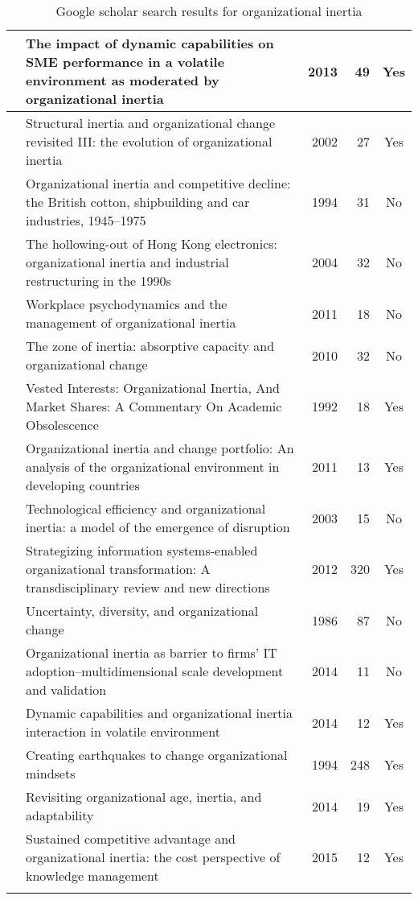 \begin{longtable}{|c|>{\raggedright\arraybackslash}p{3.7cm}|r|r|c|}
	\hline 
    \cite{nedzinskas2013impact} & The impact of dynamic capabilities on SME performance in a volatile environment as moderated by organizational inertia & 2013 & 49 & Yes \\
	\hline 
    \cite{hannan2002structural} & Structural inertia and organizational change revisited III: the evolution of organizational inertia & 2002 & 27 & Yes \\
	\hline 
    \cite{lorenz1994organizational} & Organizational inertia and competitive decline: the British cotton, shipbuilding and car industries, 1945--1975 & 1994 & 31 & No \\
	\hline 
    \cite{chiu2004hollowing} & The hollowing-out of Hong Kong electronics: organizational inertia and industrial restructuring in the 1990s & 2004 & 32 & No \\
	\hline 
    \cite{allcorn2011workplace} & Workplace psychodynamics and the management of organizational inertia & 2011 & 18 & No \\
	\hline 
    \cite{godkin2010zone} & The zone of inertia: absorptive capacity and organizational change & 2010 & 32 & No \\
	\hline 
    \cite{bromley1992vested} & Vested Interests: Organizational Inertia, And Market Shares: A Commentary On Academic Obsolescence & 1992 & 18 & Yes \\
	\hline 
    \cite{majid2011organizational} & Organizational inertia and change portfolio: An analysis of the organizational environment in developing countries & 2011 & 13 & Yes \\
	\hline 
    \cite{buchta2003technological} & Technological efficiency and organizational inertia: a model of the emergence of disruption & 2003 & 15 & No \\
	\hline 
    \cite{besson2012strategizing} & Strategizing information systems-enabled organizational transformation: A transdisciplinary review and new directions & 2012 & 320 & Yes \\
	\hline 
    \cite{hannan1986uncertainty} & Uncertainty, diversity, and organizational change & 1986 & 87 & No \\
	\hline 
    \cite{haag2014organizational} & Organizational inertia as barrier to firms’ IT adoption--multidimensional scale development and validation & 2014 & 11 & No \\
	\hline 
    \cite{nedzinskas2014dynamic} & Dynamic capabilities and organizational inertia interaction in volatile environment & 2014 & 12 & Yes \\
	\hline 
    \cite{reger1994creating} & Creating earthquakes to change organizational mindsets &  1994 & 248 & Yes \\
	\hline 
    \cite{chen2014revisiting} & Revisiting organizational age, inertia, and adaptability & 2014 & 19 & Yes \\
	\hline 
    \cite{hung2015sustained} & Sustained competitive advantage and organizational inertia: the cost perspective of knowledge management & 2015 & 12 & Yes \\
	\hline 
	\caption{Google scholar search results for organizational inertia} 
\end{longtable} 

